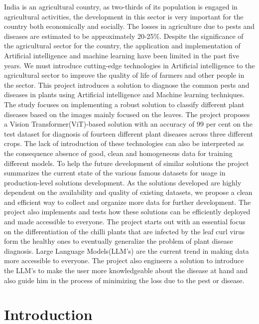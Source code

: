 \documentclass[a4paper, 12pt]{report}
\theoremstyle{definition}
\begin{document}
 India is an agricultural country, as two-thirds of its population is engaged in agricultural activities, the development in this sector is very important for the country both economically and socially.  The losses in agriculture due to pests and diseases are estimated to be approximately 20-25\%. Despite the significance of the agricultural sector for the country, the application and implementation of Artificial intelligence and machine learning have been limited in the past five years. We must introduce cutting-edge technologies in Artificial intelligence to the agricultural sector to improve the quality of life of farmers and other people in the sector. This project introduces a solution to diagnose the common pests and diseases in plants using Artificial intelligence and Machine learning techniques. The study focuses on implementing a robust solution to classify different plant diseases based on the images mainly focused on the leaves. The project proposes a Vision Transformer(ViT)-based solution with an accuracy of 99 per cent on the test dataset for diagnosis of fourteen different plant diseases across three different crops. The lack of introduction of these technologies can also be interpreted as the consequence absence of good, clean and homogeneous data for training different models. To help the future development of similar solutions the project summarizes the current state of the various famous datasets for usage in production-level solutions development. As the solutions developed are highly dependent on the availability and quality of existing datasets, we propose a clean and efficient way to collect and organize more data for further development. The project also implements and tests how these solutions can be efficiently deployed and made accessible to everyone. The project starts out with an essential focus on the differentiation of the chilli plants that are infected by the leaf curl virus form the healthy ones to eventually generalize the problem of plant disease diagnosis.  Large Language Models(LLM's) are the current trend in making data more accessible to everyone. The project also engineers a solution to introduce the LLM's to make the user more knowledgeable about the disease at hand and also guide him in the process of minimizing the loss due to the pest or disease.

\clearpage
{}
\setcounter{page}{1}
\chapter{Introduction}

\end{document}
